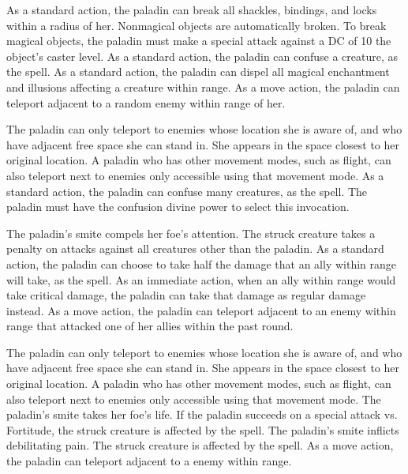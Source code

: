  As a standard action, the paladin can break all shackles, bindings, and locks within a \arealarge radius of her. Nonmagical objects are automatically broken. To break magical objects, the paladin must make a special attack against a DC of 10 \add the object's caster level.
 As a standard action, the paladin can confuse a creature, as the  spell.
 As a standard action, the paladin can dispel all magical enchantment and illusions affecting a creature within \rngmed range.
 As a move action, the paladin can teleport adjacent to a random enemy within \rngmed range of her.

The paladin can only teleport to enemies whose location she is aware of, and who have adjacent free space she can stand in. She appears in the space closest to her original location. A paladin who has other movement modes, such as flight, can also teleport next to enemies only accessible using that movement mode.
 As a standard action, the paladin can confuse many creatures, as the  spell. The paladin must have the confusion divine power to select this invocation.

 The paladin's smite compels her foe's attention. The struck creature takes a  penalty on attacks against all creatures other than the paladin.
 As a standard action, the paladin can choose to take half the damage that an ally within \rngmed range will take, as the  spell.
 As an immediate action, when an ally within \rngmed range would take critical damage, the paladin can take that damage as regular damage instead.
 As a move action, the paladin can teleport adjacent to an enemy within \rngmed range that attacked one of her allies within the past round.

The paladin can only teleport to enemies whose location she is aware of, and who have adjacent free space she can stand in. She appears in the space closest to her original location. A paladin who has other movement modes, such as flight, can also teleport next to enemies only accessible using that movement mode.
 The paladin's smite takes her foe's life. If the paladin succeeds on a special attack vs. Fortitude, the struck creature is affected by the  spell.
 The paladin's smite inflicts debilitating pain. The struck creature is affected by the  spell.
 As a move action, the paladin can teleport adjacent to a \bloodied enemy within \rngmed range.

